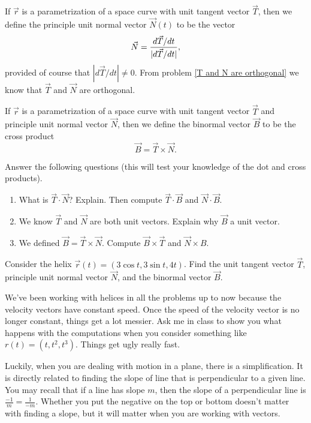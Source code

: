\begin{definition}
 If $\vec r$ is a parametrization of a space curve with unit tangent vector $\vec T$, then we define the principle unit normal vector $\vec N(t)$ to be the vector
 $$\vec N = \displaystyle\frac{d\vec T/dt}{|d\vec T/dt|},$$
 provided of course that $|d\vec T/dt|\neq 0$. 
 From problem \ref{T and N are orthogonal} we know that $\vec T$ and $\vec N$ are orthogonal.
\end{definition}

\begin{definition}
 If $\vec r$ is a parametrization of a space curve with unit tangent vector $\vec T$ and principle unit normal vector $\vec N$, then we define the binormal vector $\vec B$ to be the cross product
$$\vec B = \vec T\times \vec N.$$
\end{definition}

\begin{problem}
Answer the following questions (this will test your knowledge of the dot and cross products).
\begin{enumerate}
 \item What is $\vec T\cdot \vec N$? Explain. Then compute $\vec T\cdot \vec B$ and $\vec N\cdot \vec B$.
 \item We know $\vec T$ and $\vec N$ are both unit vectors. Explain why $\vec B$ a unit vector. 
 \item We defined $\vec B=\vec T\times \vec N$. Compute $\vec B\times \vec T$ and $\vec N\times B$.
\end{enumerate}
\end{problem}

\begin{problem} \label{helix example of T N and B}
Consider the helix $\vec r(t) = (3\cos t,3\sin t, 4t)$.  Find the unit tangent vector $\vec T$, principle unit normal vector $\vec N$, and the binormal vector $\vec B$.  
\end{problem}

We've been working with helices in all the problems up to now because the velocity vectors have constant speed.  Once the speed of the velocity vector is no longer constant, things get a lot messier. Ask me in class to show you what happens with the computations when you consider something like $r(t)=(t,t^2,t^3)$. Things get ugly really fast. 

Luckily, when you are dealing with motion in a plane, there is a simplification.  It is directly related to finding the slope of line that is perpendicular to a given line.  You may recall that if a line has slope $m$, then the slope of a perpendicular line is $\frac{-1}{m}=\frac{1}{-m}$.  Whether you put the negative on the top or bottom doesn't matter with finding a slope, but it will matter when you are working with vectors.  

